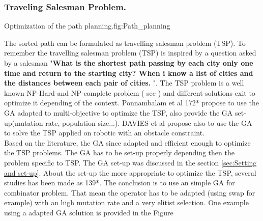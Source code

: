 \subsubsection*{Traveling Salesman Problem. }\label{sec:TSP2}


\begin{mfigures}[!]{Optimization of the path planning.}{fig:Path_planning} \centering
{}
\hspace{1cm}
\end{mfigures}	

The sorted path can be formulated as travelling salesman problem (TSP). To remember the travelling salesman problem (TSP) is inspired by a question asked by a salesman  "\textbf{What is the shortest path passing by each city only one time and return to the starting city? When i know a list of cities and the distances between each pair of cities. }". The TSP problem is a well known NP-Hard and NP-complete problem ( see \citep{236*karp1972}) and different solutions exit to optimize it depending of the context. 
Ponnambalam et al 172* \cite{172*} propose to use the GA adapted to  multi-objective to optimize the TSP, also provide the GA set-up(mutation rate, population size...). DAVIES et al \cite{56*davies2006} propose also to use the GA to solve the TSP applied on robotic with an obstacle constraint. \\
Based on the literature, the GA since adapted and efficient enough to optimize the TSP problems.
The GA  has to be set-up properly depending then the problem specific to TSP. The GA set-up was discussed in the section \ref{sec:Setting and set-up}. About the set-up the more appropriate to optimize the TSP, several studies has been made  as  \citep{68*muhlenbein1989,80*serpell2010,139*razali2011}139*. The conclusion is to use an simple GA for combinator problem. That mean the operator has to be adapted (using swap for example) with an high mutation rate and a very elitist selection.
One example  using a adapted GA solution is provided in the Figure 



